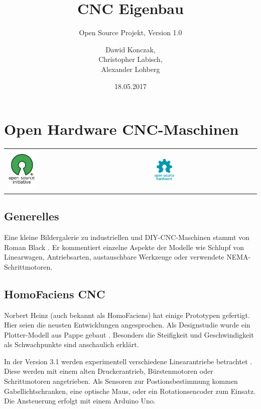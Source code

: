 \documentclass[
	a4paper,
	smallheadings,
	german,
	]
	{scrreprt}
\title{CNC Eigenbau}
\subtitle{Open Source Projekt, Version 1.0}
\date{18.05.2017}
\author{Dawid Konczak, \\ Christopher Labisch, \\ Alexander Lohberg}
\begin{document}
\maketitle
\tableofcontents
\chapter{Open Hardware CNC-Maschinen}
\begin{tabularx}{\textwidth}{XX}
\includegraphics[width=0.2\textwidth]{../Grafiken/Opensource.png} & \includegraphics[width=0.2\textwidth]{../Grafiken/Open-source-hardware-logo.png}
\end{tabularx}
\section{Generelles}
Eine kleine Bildergalerie zu industriellen und DIY-CNC-Maschinen stammt von Roman Black \autocite{:01}.
Er kommentiert einzelne Aspekte der Modelle wie Schlupf von Linearwagen, Antriebsarten, austauschbare Werkzeuge oder verwendete NEMA-Schrittmotoren.



\section{HomoFaciens CNC}
Norbert Heinz (auch bekannt als HomoFaciens) hat einige Prototypen gefertigt.
Hier seien die neusten Entwicklungen angesprochen.
Als Designstudie wurde ein Plotter-Modell aus Pappe gebaut \autocite{:Heinz_CNC_3.0}.
Besonders die Steifigkeit und Geschwindigkeit als Schwachpunkte sind anschaulich erklärt.

In der Version 3.1 werden experimentell verschiedene Linearantriebe betrachtet \autocite{:Heinz_CNC_3.1}.
Diese werden mit einem alten Druckerantrieb, Bürstenmotoren oder Schrittmotoren angetrieben.
Als Sensoren zur Postionsbestimmung kommen Gabellichtschranken, eine optische Maus, oder ein Rotationsencoder zum Einsatz.
Die Ansteuerung erfolgt mit einem Arduino Uno.
\end{document}
